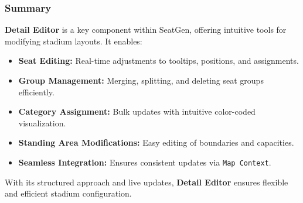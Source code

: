 \subsubsection{Summary}
\textbf{Detail Editor} is a key component within SeatGen, offering intuitive tools for modifying stadium layouts. It enables:
\begin{itemize}
    \item \textbf{Seat Editing:} Real-time adjustments to tooltips, positions, and assignments.
    \item \textbf{Group Management:} Merging, splitting, and deleting seat groups efficiently.
    \item \textbf{Category Assignment:} Bulk updates with intuitive color-coded visualization.
    \item \textbf{Standing Area Modifications:} Easy editing of boundaries and capacities.
    \item \textbf{Seamless Integration:} Ensures consistent updates via \texttt{Map Context}.
\end{itemize}

With its structured approach and live updates, \textbf{Detail Editor} ensures flexible and efficient stadium configuration.
